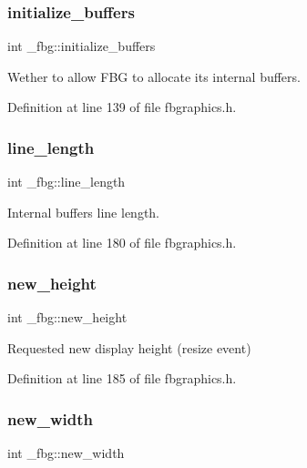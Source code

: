 \subsubsection{\texorpdfstring{initialize\+\_\+buffers}{initialize\_buffers}}
{\footnotesize\ttfamily int \+\_\+fbg\+::initialize\+\_\+buffers}



Wether to allow F\+BG to allocate its internal buffers. 



Definition at line 139 of file fbgraphics.\+h.

\mbox{\label{struct__fbg_af8a1ee8d7004e6f2193f2a3ed98f8ce8}} 
\subsubsection{\texorpdfstring{line\+\_\+length}{line\_length}}
{\footnotesize\ttfamily int \+\_\+fbg\+::line\+\_\+length}



Internal buffers line length. 



Definition at line 180 of file fbgraphics.\+h.

\mbox{\label{struct__fbg_a509aa5f8f0a94d8313bb4da777aa64bc}} 
\subsubsection{\texorpdfstring{new\+\_\+height}{new\_height}}
{\footnotesize\ttfamily int \+\_\+fbg\+::new\+\_\+height}



Requested new display height (resize event) 



Definition at line 185 of file fbgraphics.\+h.

\mbox{\label{struct__fbg_a95859bd418a5cfff155cdb1421d295ef}} 
\subsubsection{\texorpdfstring{new\+\_\+width}{new\_width}}
{\footnotesize\ttfamily int \+\_\+fbg\+::new\+\_\+width}



